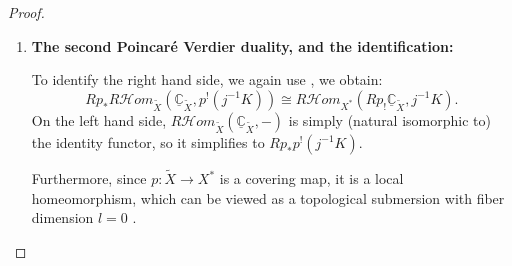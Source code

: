 \begin{proof}
\begin{enumerate}
              The composition is then realized at the level of chain complexes.
              A local section (which is a cochain map) $v^\bullet: F^\bullet \to j^{-1}I^\bullet$ evaluates exactly as:
              \[
                  v^\bullet \longmapsto j_!(v^\bullet) \longmapsto \varepsilon_{I^\bullet} \circ j_!(v^\bullet) = (v^\bullet)^\flat.
              \]
              This matches exactly the adjoint map $(v^\bullet)^\flat$ we explicitly wrote down in our adjunction pair above.
              And \cite[Thm.~3.10]{KashiwaraSchapira1994Sheaves} says it is a quasi-isomorphism.

              Therefore, taking $f=j$, $F=Rp_!\underline{\mathbb{C}}_{\widetilde{X}}$, and $G=K$, we obtain the isomorphism:
              \[
                  R\mathcal Hom_X\left(j_! Rp_! \underline{\mathbb{C}}_{\widetilde{X}}, K\right) \cong Rj_* R\mathcal Hom_{X^*}\left(Rp_! \underline{\mathbb{C}}_{\widetilde{X}}, j^{-1} K\right).
              \]
              Combining this with the equality from steps 1-3, we get:
              \[
                  R\mathcal Hom_X\left(f^{-1}\pi_! \underline{\mathbb{C}}_{\widetilde{\mathbb{C}}^*}, K\right) \cong Rj_* R\mathcal Hom_{X^*}\left(Rp_! \underline{\mathbb{C}}_{\widetilde{X}}, j^{-1} K\right).
              \]

        \item \textbf{The second Poincar\'e Verdier duality, and the identification:}

              To identify the right hand side, we again use \cite[Thm.~3.1.10]{KashiwaraSchapira1994Sheaves}, we obtain:
              \[
                  Rp_* R\mathcal Hom_{\widetilde{X}}\left(\underline{\mathbb{C}}_{\widetilde{X}}, p^!(j^{-1}K)\right) \cong R\mathcal Hom_{X^*}\left(Rp_! \underline{\mathbb{C}}_{\widetilde{X}}, j^{-1} K\right).
              \]
              On the left hand side, $R\mathcal Hom_{\widetilde{X}}(\underline{\mathbb{C}}_{\widetilde{X}}, -)$ is simply (natural isomorphic to) the identity functor, so it simplifies to $Rp_* p^!(j^{-1}K)$.

              Furthermore, since $p: \widetilde{X} \to X^*$ is a covering map, it is a local homeomorphism,
              which can be viewed as a topological submersion with fiber dimension $l = 0$ \cite[Definition 3.3.1]{KashiwaraSchapira1994Sheaves}.


\end{enumerate}
\end{proof}
